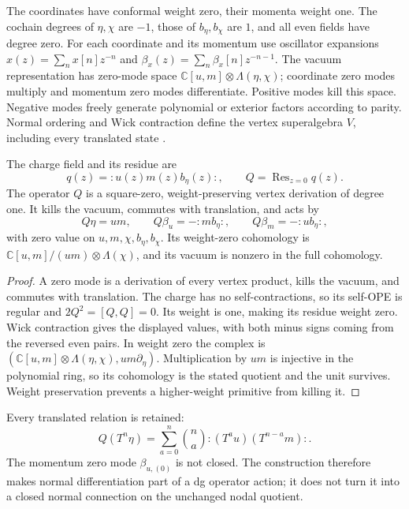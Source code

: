 The coordinates have conformal weight zero, their momenta weight one.
The cochain degrees of $\eta,\chi$ are $-1$, those of
$b_\eta,b_\chi$ are $1$, and all even fields have degree zero.
For each coordinate and its momentum use oscillator expansions
$x(z)=\sum_nx[n]z^{-n}$ and
$\beta_x(z)=\sum_n\beta_x[n]z^{-n-1}$.
The vacuum representation has zero-mode space
$\mathbb C[u,m]\otimes\Lambda(\eta,\chi)$; coordinate zero modes
multiply and momentum zero modes differentiate.  Positive modes kill
this space.  Negative modes freely generate polynomial or exterior
factors according to parity.  Normal ordering and Wick contraction
define the vertex superalgebra $V$, including every translated state
\cite[\S\S2.1, 3.2]{cyquant:MalikovSchechtman}.

\begin{proposition}\label{cyquant:prop:nodal-differential}
The charge field and its residue are
\[
 q(z)={:}u(z)m(z)b_\eta(z){:},\qquad
 Q=\operatorname{Res}_{z=0}q(z).
\]
The operator $Q$ is a square-zero, weight-preserving vertex derivation of degree one.
It kills the vacuum, commutes with translation, and acts by
\[
 Q\eta=um,\qquad Q\beta_u=-{:}mb_\eta{:},\qquad
 Q\beta_m=-{:}ub_\eta{:},
\]
with zero value on $u,m,\chi,b_\eta,b_\chi$.
Its weight-zero cohomology is
$\mathbb C[u,m]/(um)\otimes\Lambda(\chi)$, and its vacuum is nonzero
in the full cohomology.
\end{proposition}

\begin{proof}
A zero mode is a derivation of every vertex product, kills the vacuum,
and commutes with translation.  The charge has no self-contractions,
so its self-OPE is regular and $2Q^2=[Q,Q]=0$.  Its weight is one,
making its residue weight zero.  Wick contraction gives the displayed
values, with both minus signs coming from the reversed even pairs.
In weight zero the complex is
$(\mathbb C[u,m]\otimes\Lambda(\eta,\chi),um\partial_\eta)$.
Multiplication by $um$ is injective in the polynomial ring, so its
cohomology is the stated quotient and the unit survives.  Weight
preservation prevents a higher-weight primitive from killing it.
\end{proof}

Every translated relation is retained:
\[
 Q(T^n\eta)=\sum_{a=0}^n\binom na{:}(T^au)(T^{n-a}m){:}.
\]
The momentum zero mode $\beta_{u,(0)}$ is not closed.  The construction
therefore makes normal differentiation part of a dg operator action;
it does not turn it into a closed normal connection on the unchanged
nodal quotient.

